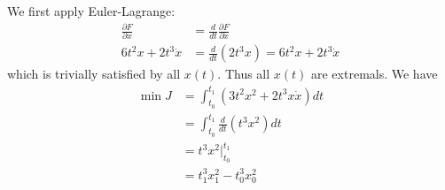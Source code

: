 \documentclass[12pt]{article}
\begin{document}
\begin{problem}[6]
We first apply Euler-Lagrange:
\begin{align*}
	\frac{\partial F}{\partial x} &= \frac{d}{dt} \frac{\partial F}{\partial \dot{x}}\\ 
	6t^2 x + 2t^3 \dot{x} &= \frac{d}{dt} (2t^3x) = 6t^2 x + 2 t^3 \dot{x} 
\end{align*}
which is trivially satisfied by all $ x(t)$. Thus all  $ x(t)$ are extremals. We have
 \begin{align*}
	 \min J &= \int_{ t_0}^{ t_1} (3t^2x^2+2t^3x \dot{x}) dt  \\
	 &= \int_{ t_0}^{ t_1} \frac{d}{dt} \left( t^3 x^2 \right) dt  \\
	 &= t^3 x^2 \bigg|_{t_0}^{t_1} \\
	 &= t_1 ^3 x_1^2 - t_0^3x_0^2 
\end{align*}
\end{problem}
\end{document}
